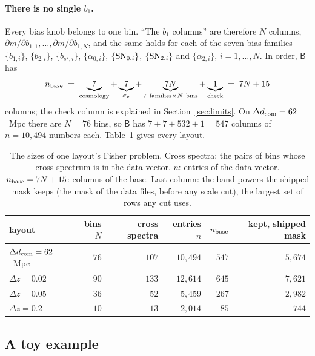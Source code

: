 \documentclass[11pt]{article}
\newcommand{\SNzi}{{\rm SN}_{0,i}}
\newcommand{\SNti}{{\rm SN}_{2,i}}
\newcommand{\mB}{\mathsf{B}}
\newcommand{\nbase}{n_{\rm base}}
\begin{document}
\paragraph{There is no single $b_1$.}
Every bias knob belongs to one bin.  ``The $b_1$ columns'' are therefore
$N$ columns, $\partial m/\partial b_{1,1}, \ldots,
\partial m/\partial b_{1,N}$, and the same holds for each of the seven
bias families $\{b_{1,i}\}$, $\{b_{2,i}\}$, $\{b_{s^2,i}\}$,
$\{\alpha_{0,i}\}$, $\{\SNzi\}$, $\{\SNti\}$ and $\{\alpha_{2,i}\}$,
$i = 1, \ldots, N$.  In order, $\mB$ has
\begin{equation}
  \nbase \;=\; \underbrace{7}_{\rm cosmology}
  + \underbrace{7}_{\sigma_v}
  + \underbrace{7N}_{7\ \text{families} \times N\ \text{bins}}
  + \underbrace{1}_{\rm check}
  \;=\; 7N + 15
  \label{eq:nbase}
\end{equation}
columns; the check column is explained in Section~\ref{sec:limits}.  On
$\Delta d_{\rm com} = 62$~Mpc there are $N = 76$ bins, so $\mB$ has
$7 + 7 + 532 + 1 = 547$ columns of $n = 10{,}494$ numbers each.
Table~\ref{tab:sizes} gives every layout.

\begin{table}[tbp]
  \centering
  \begin{tabular}{lrrrrr}
    \hline
    layout & bins $N$ & cross spectra & entries $n$ & $\nbase$
      & kept, shipped mask \\
    \hline
    $\Delta d_{\rm com} = 62$~Mpc & $76$ & $107$ & $10{,}494$ & $547$ & $5{,}674$ \\
    $\Delta z = 0.02$             & $90$ & $133$ & $12{,}614$ & $645$ & $7{,}621$ \\
    $\Delta z = 0.05$             & $36$ & $52$  & $5{,}459$  & $267$ & $2{,}982$ \\
    $\Delta z = 0.2$              & $10$ & $13$  & $2{,}014$  & $85$  & $744$ \\
    \hline
  \end{tabular}
  \caption{The sizes of one layout's Fisher problem.  Cross spectra: the
    pairs of bins whose cross spectrum is in the data vector.  $n$:
    entries of the data vector.  $\nbase = 7N + 15$: columns of the
    base.  Last column: the band powers the shipped mask keeps (the
    mask of the data files, before any scale cut), the largest set of
    rows any cut uses.}
  \label{tab:sizes}
\end{table}

\subsection{A toy example}
\label{sec:toy}
\end{document}
